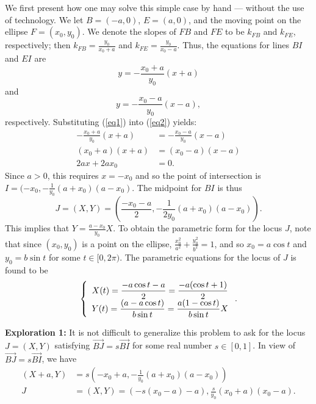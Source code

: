 \documentclass[12pt,a4paper]{article}%
\begin{document}
We first present how one may solve this simple case by hand --- without the
use of technology. We let $B=(-a,0)$, $E=(a,0)$, and the moving
point on the ellipse $F=(x_{0},y_{0})$. We denote the slopes of $FB$ and $FE$
to be $k_{FB}$ and $k_{FE}$, respectively; then
$k_{FB}=\frac{y_{0}}{x_{0}+a}$ and $k_{FE}=\frac{y_{0}}{x_{0}-a}$.
Thus, the equations for lines $BI$ and $EI$ are%
\begin{equation}
y=-\frac{x_{0}+a}{y_{0}}\left(  x+a\right) \label{eq1}%
\end{equation}
and
\begin{equation}
y=-\frac{x_{0}-a}{y_{0}}\left(  x-a\right), \label{eq2}%
\end{equation}
respectively. Substituting (\ref{eq1}) into (\ref{eq2}) yields:
\begin{align*}
-\frac{x_{0}+a}{y_{0}}\left(  x+a\right)   & =-\frac{x_{0}-a}{y_{0}}\left(
x-a\right) \\
\left(  x_{0}+a\right)  \left(  x+a\right)   & =\left(  x_{0}-a\right)
\left(  x-a\right) \\
2ax+2ax_{0}  & =0.
\end{align*}
Since $a>0$, this requires $x=-x_0$ and so the point of intersection is
$I=(-x_{0},\allowbreak-\frac{1}{y_{0}}\left(  a+x_{0}\right)  \left(
a-x_{0}\right)$.
The midpoint for $BI$ is thus
\[
J=\left(  X,Y\right)  =\left(  \frac{-x_{0}-a}{2},-\frac{1}{2y_{0}}\left(
a+x_{0}\right)  \left(  a-x_{0}\right)  \right)  .
\]
This implies that $Y=\frac{a-x_0}{y_{0}}X$. To obtain the parametric form
for the locus $J$, note that since $(x_0, y_0)$ is a point on the ellipse,
$\frac{x_{0}^{2}}{a^{2}}+\frac{y_{0}^{2}}{b^{2}}=1$, and so
$x_{0}=a\cos t$ and $y_{0}=b\sin t$ for some $t\in[0,2\pi)$.
The parametric equations for the locus of $J$ is found to be
\[
\left\{
\begin{array}
[c]{c}%
X(t) =\dfrac{-a\cos t-a}{2}=\dfrac{-a(\cos t+1)}{2}\\
Y(t) =\dfrac{(a-a\cos t)}{b\sin t}=\dfrac{a(1-\cos t)}{b\sin t} X
\end{array}
\right.  .
\]

\textbf{Exploration 1:}
It is not difficult to generalize this problem to ask for
the locus $J=(X,Y)$ satisfying $\overrightarrow{BJ}=s\overrightarrow{BI}$ for
some real number $s\in[0,1]$.
In view of $\overrightarrow{BJ}=s\overrightarrow{BI}$, we have
\begin{align*}
(X+a,Y)  & =s\left(  -x_{0}+a,-\frac{1}{y_{0}}\left(  a+x_{0}\right)  \left(
a-x_{0}\right)  \right) \\
J  & =\left(  X,Y\right)  =\left(  -s(x_{0}-a)-a\right)  ,\allowbreak\frac
{s}{y_{0}}\left(  x_{0}+a\right)  \left(  x_{0}-a\right).
\end{align*}
\end{document}
